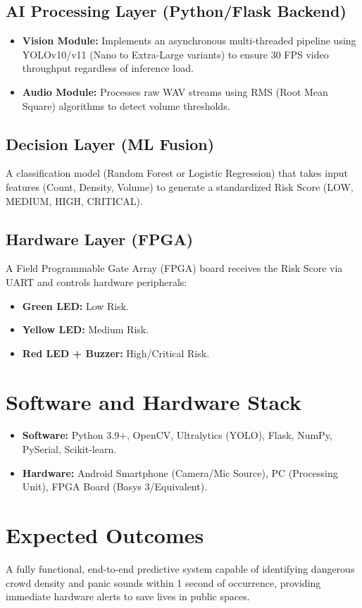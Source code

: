 \documentclass[12pt,a4paper]{article}
\begin{document}
\subsection{AI Processing Layer (Python/Flask Backend)}
\begin{itemize}
    \item \textbf{Vision Module:} Implements an asynchronous multi-threaded pipeline using YOLOv10/v11 (Nano to Extra-Large variants) to ensure 30 FPS video throughput regardless of inference load.
    \item \textbf{Audio Module:} Processes raw WAV streams using RMS (Root Mean Square) algorithms to detect volume thresholds.
\end{itemize}

\subsection{Decision Layer (ML Fusion)}
A classification model (Random Forest or Logistic Regression) that takes input features (Count, Density, Volume) to generate a standardized Risk Score (LOW, MEDIUM, HIGH, CRITICAL).

\subsection{Hardware Layer (FPGA)}
A Field Programmable Gate Array (FPGA) board receives the Risk Score via UART and controls hardware peripherals:
\begin{itemize}
    \item \textbf{Green LED:} Low Risk.
    \item \textbf{Yellow LED:} Medium Risk.
    \item \textbf{Red LED + Buzzer:} High/Critical Risk.
\end{itemize}

\section{Software and Hardware Stack}
\begin{itemize}
    \item \textbf{Software:} Python 3.9+, OpenCV, Ultralytics (YOLO), Flask, NumPy, PySerial, Scikit-learn.
    \item \textbf{Hardware:} Android Smartphone (Camera/Mic Source), PC (Processing Unit), FPGA Board (Basys 3/Equivalent).
\end{itemize}

\section{Expected Outcomes}
A fully functional, end-to-end predictive system capable of identifying dangerous crowd density and panic sounds within 1 second of occurrence, providing immediate hardware alerts to save lives in public spaces.
\end{document}
